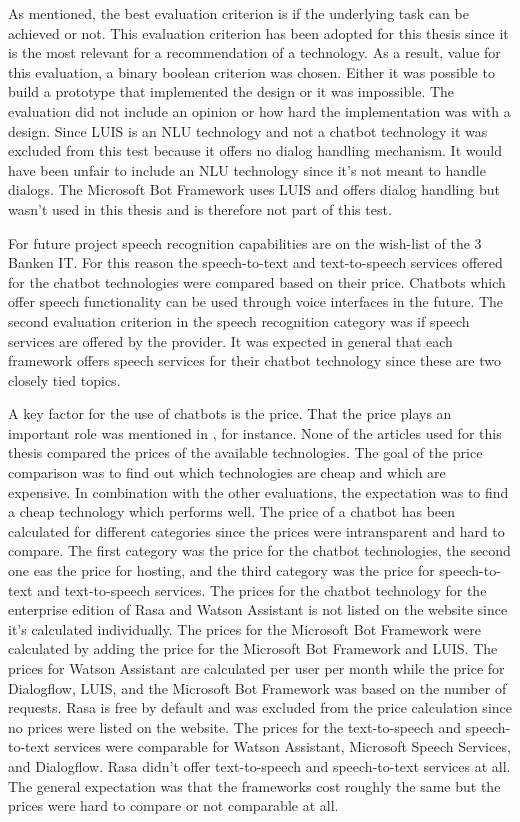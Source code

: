 As \citet{singhbuilding} mentioned, the best evaluation criterion is if the underlying task can be achieved or not.
This evaluation criterion has been adopted for this thesis since it is the 
most relevant for a recommendation of a technology.
As a result, value for this evaluation, a binary boolean criterion was chosen.
Either it was possible to build a prototype that implemented the design or it was impossible.
The evaluation did not include an opinion or how hard the implementation was with a design.
Since LUIS is an NLU technology and not a chatbot technology it was excluded from this test because it offers no dialog handling mechanism.
It would have been unfair to include an NLU technology since it's not meant to handle dialogs.
The Microsoft Bot Framework uses LUIS and offers dialog handling but wasn't used in this thesis and is therefore not part of this test.

For future project speech recognition capabilities are on the wish-list of the 3 Banken IT.
For this reason the speech-to-text and text-to-speech services offered for the 
chatbot technologies were compared based on their price.
Chatbots which offer speech functionality can be used through 
voice interfaces in the future.
The second evaluation criterion in the speech recognition category was
if speech services are offered by the provider. 
It was expected in general that each framework offers speech services for their chatbot technology since these are two closely tied topics.

A key factor for the use of chatbots is the price.
That the price plays an important role was mentioned in \citet{buiildChatbotsPython}, for instance.
None of the articles used for this thesis compared the prices of the 
available technologies.
The goal of the price comparison was to find out which technologies are cheap and which are expensive.
In combination with the other evaluations, the expectation was to find a cheap technology 
which performs well.
The price of a chatbot has been calculated for different categories since the prices were intransparent and hard to compare.
The first category was the price for the chatbot technologies, the second 
one eas the price for hosting, and the third category was the price 
for speech-to-text and text-to-speech services.
The prices for the chatbot technology for the enterprise edition of Rasa 
and Watson Assistant is not listed on the website since it's calculated 
individually.
The prices for the Microsoft Bot Framework were calculated by adding the price for the Microsoft Bot Framework and LUIS.
The prices for Watson Assistant are calculated per user per month while the price for Dialogflow, LUIS, and the Microsoft Bot Framework was based on the number of requests.
Rasa is free by default and was excluded from the price calculation since 
no prices were listed on the website.
The prices for the text-to-speech and speech-to-text services were comparable for Watson Assistant, Microsoft Speech Services, and Dialogflow.
Rasa didn't offer text-to-speech and speech-to-text services at all.
The general expectation was that the frameworks cost roughly the same but the prices were hard to compare or not comparable at all.

